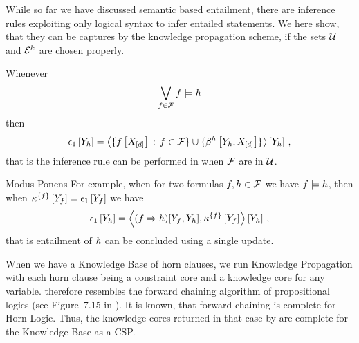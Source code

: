 
While so far we have discussed semantic based entailment, there are inference rules exploiting only logical syntax to infer entailed statements.
We here show, that they can be captures by the knowledge propagation scheme, if the sets $\mathcal{U}$ and $\mathcal{E}^{k}$ are chosen properly.

Whenever
\begin{align*}
    \bigvee_{f\in\mathcal{F}} f \models h
\end{align*}
then
\begin{align*}
    \epsilon_{1}\left[Y_{h}\right] =
    \left\langle \{f\left[X_{[d]}\right] \,:\, f\in\mathcal{F}\} \cup \{\beta^{h}\left[Y_{h},X_{[d]}\right]\}\right\rangle \left[ Y_{h} \right] \, ,
\end{align*}
that is the inference rule can be performed in when $\mathcal{F}$ are in $\mathcal{U}$.

\begin{example}{Modus Ponens}
    For example, when for two formulas $f,h\in\mathcal{F}$ we have $f\models h$, then when $\kappa^{\{f\}}\left[Y_{f}\right] = \epsilon_{1}\left[Y_{f}\right]$ we have
    \begin{align*}
        \epsilon_{1}\left[Y_{h}\right]
        = \left\langle (f\Rightarrow h)[Y_{f},Y_{h}],\kappa^{\{f\}}\left[Y_{f}\right]\right\rangle \left[ Y_{h} \right] \, ,
    \end{align*}
    that is entailment of $h$ can be concluded using a single update.

    When we have a Knowledge Base of horn clauses, we run Knowledge Propagation with each horn clause being a constraint core and a knowledge core for any variable.
     therefore resembles the forward chaining algorithm of propositional logics (see Figure~7.15 in \cite{russell_artificial_2021}).
    It is known, that forward chaining is complete for Horn Logic.
    Thus, the knowledge cores returned in that case by  are complete for the Knowledge Base as a CSP.
\end{example}




